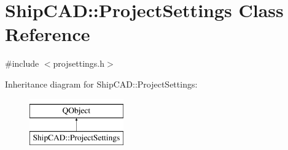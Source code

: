 \hypertarget{classShipCAD_1_1ProjectSettings}{\section{Ship\-C\-A\-D\-:\-:Project\-Settings Class Reference}
\label{classShipCAD_1_1ProjectSettings}
}


{\ttfamily \#include $<$projsettings.\-h$>$}

Inheritance diagram for Ship\-C\-A\-D\-:\-:Project\-Settings\-:\begin{figure}[H]
\begin{center}
\leavevmode
\includegraphics[height=2.000000cm]{classShipCAD_1_1ProjectSettings}
\end{center}
\end{figure}
